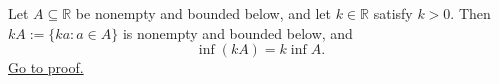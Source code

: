 \begin{theorem}
\label{thm:positive-scalar-mult-infimum}
Let $A\subseteq\mathbb{R}$ be nonempty and bounded below, and let
$k\in\mathbb{R}$ satisfy $k>0$.  Then $kA:=\{ka:a\in A\}$ is nonempty and
bounded below, and
\[
  \inf(kA)=k\inf A.
\]
\hyperref[prf:positive-scalar-mult-infimum]{Go to proof.}
\end{theorem}